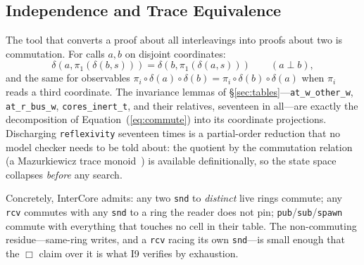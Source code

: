\documentclass[10pt,journal,compsoc,twocolumn]{article}
\theoremstyle{definition}
\theoremstyle{remark}
\theoremstyle{plain}
\newcommand{\ctr}[1]{\texttt{#1}}
\begin{document}
\subsection{Independence and Trace Equivalence}
\label{sec:traces}
The tool that converts a proof about all interleavings into proofs about two is commutation. For calls \(a, b\) on disjoint coordinates:
\begin{equation}
\label{eq:commute}
\delta(a, \pi_1(\delta(b, s))) = \delta(b, \pi_1(\delta(a, s))) \qquad (a \perp b),
\end{equation}
and the same for observables \(\pi_i \circ \delta(a) \circ \delta(b) = \pi_i \circ \delta(b) \circ \delta(a)\) when \(\pi_i\) reads a third coordinate. The invariance lemmas of \S\ref{sec:tables}---\ctr{at\_w\_other\_w}, \ctr{at\_r\_bus\_w}, \ctr{cores\_inert\_t}, and their relatives, seventeen in all---are exactly the decomposition of Equation~(\ref{eq:commute}) into its coordinate projections. Discharging \lstinline|reflexivity| seventeen times is a partial-order reduction that no model checker needs to be told about: the quotient by the commutation relation (a Mazurkiewicz trace monoid~\cite{diekert1997traces}) is available definitionally, so the state space collapses \emph{before} any search.

Concretely, InterCore admits: any two \ctr{snd} to \emph{distinct} live rings commute; any \ctr{rcv} commutes with any \ctr{snd} to a ring the reader does not pin; \ctr{pub}/\ctr{sub}/\ctr{spawn} commute with everything that touches no cell in their table. The non-commuting residue---same-ring writes, and a \ctr{rcv} racing its own \ctr{snd}---is small enough that the \(\Box\) claim over it is what I9 verifies by exhaustion.
\end{document}
